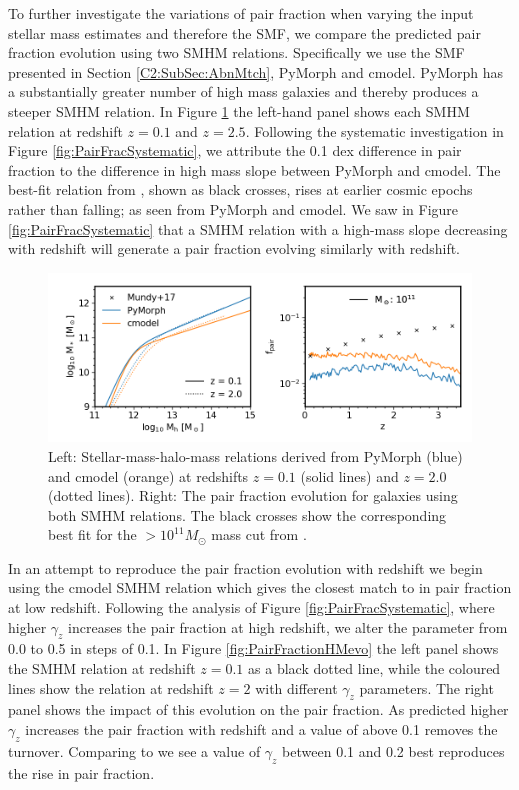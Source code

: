 To further investigate the variations of pair fraction when varying the input stellar mass estimates and therefore the SMF, we compare the predicted pair fraction evolution using two SMHM relations. Specifically we use the SMF presented in Section \ref{C2:SubSec:AbnMtch}, PyMorph and cmodel. PyMorph has a substantially greater number of high mass galaxies and thereby produces a steeper SMHM relation.
In Figure \ref{fig:PairFractionData} the left-hand panel shows each SMHM relation at redshift $z = 0.1$ and $z = 2.5$. Following the systematic investigation in Figure \ref{fig:PairFracSystematic}, we attribute the 0.1 dex difference in pair fraction to the difference in high mass slope between PyMorph and cmodel. The best-fit relation from \citet{Mundy2017A3.5}, shown as black crosses, rises at earlier cosmic epochs rather than falling; as seen from PyMorph and cmodel. We saw in Figure \ref{fig:PairFracSystematic} that a SMHM relation with a high-mass slope decreasing with redshift will generate a pair fraction evolving similarly with redshift.

\begin{figure}
    \centering
    \includegraphics[width = \linewidth]{Figures/Chapter5/PairFractionData.png}
    \caption{Left: Stellar-mass-halo-mass relations derived from PyMorph (blue) and cmodel (orange) at redshifts $z=0.1$ (solid lines) and $z=2.0$ (dotted lines). Right: The pair fraction evolution for galaxies using both SMHM relations. The black crosses show the corresponding best fit for the $>10^{11}M_{\odot}$ mass cut from \citet{Mundy2017A3.5}.}
    \label{fig:PairFractionData}
\end{figure}

In an attempt to reproduce the \citet{Mundy2017A3.5} pair fraction evolution with redshift we begin using the cmodel SMHM relation which gives the closest match to \citet{Mundy2017A3.5} in pair fraction at low redshift. Following the analysis of Figure \ref{fig:PairFracSystematic}, where higher $\gamma_{z}$ increases the pair fraction at high redshift, we alter the parameter from 0.0 to 0.5 in steps of 0.1. In Figure \ref{fig:PairFractionHMevo} the left panel shows the SMHM relation at redshift $z=0.1$ as a black dotted line, while the coloured lines show the relation at redshift $z = 2$ with different $\gamma_{z}$ parameters. The right panel shows the impact of this evolution on the pair fraction. As predicted higher $\gamma_{z}$ increases the pair fraction with redshift and a value of above 0.1 removes the turnover. Comparing to \citet{Mundy2017A3.5} we see a value of $\gamma_{z}$ between 0.1 and 0.2 best reproduces the rise in pair fraction. 

